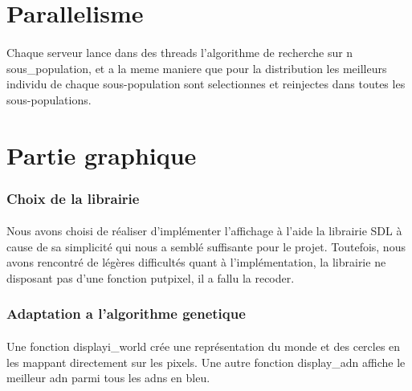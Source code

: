 \documentclass{article}
\begin{document}
\section{Parallelisme} %
\label{sec:Parallelisme}
  \paragraph{} %
  \label{par:}
    Chaque serveur lance dans des threads l'algorithme de recherche sur n
    sous\_population, et a la meme maniere que pour la distribution les meilleurs individu
    de chaque sous-population sont selectionnes et reinjectes dans toutes les
    sous-populations.
  

\section{Partie graphique} %
\label{sec:Partie graphique}

  \subsubsection{Choix de la librairie} %
  \label{ssub:Choix de la librairie}
    \paragraph{} %
    \label{par:}
      Nous avons choisi de réaliser d'implémenter l'affichage à l'aide la
      librairie SDL à cause de sa simplicité qui nous a semblé suffisante pour
      le projet.
      Toutefois, nous avons rencontré de légères difficultés quant à
      l'implémentation, la librairie ne disposant pas d'une fonction putpixel,
      il a fallu la recoder.


  \subsubsection{Adaptation a l'algorithme genetique} %
  \label{ssub:Adaptation a l'algorithme genetique}
    \paragraph{} %
    \label{par:}
      Une fonction displayi\_world crée une représentation du monde et des cercles
      en les mappant directement sur les pixels.
      Une autre fonction display\_adn affiche le meilleur adn parmi tous les
      adns en bleu.
\end{document}
